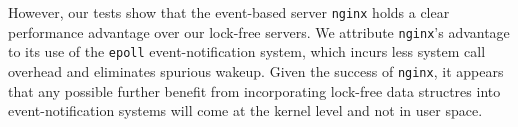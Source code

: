 \documentclass[twoside,10pt]{article}
\begin{document}
\begin{multicols}{2}
However, our tests show that the event-based server \verb+nginx+ holds
a clear performance advantage over our lock-free servers. We attribute
\verb+nginx+'s advantage to its use of the \verb+epoll+
event-notification system, which incurs less system call overhead and
eliminates spurious wakeup. Given the success of \verb+nginx+, it
appears that any possible further benefit from incorporating lock-free
data structres into event-notification systems will come at the kernel
level and not in user space.



\end{multicols}

{\small
  
  
}
\end{document}
